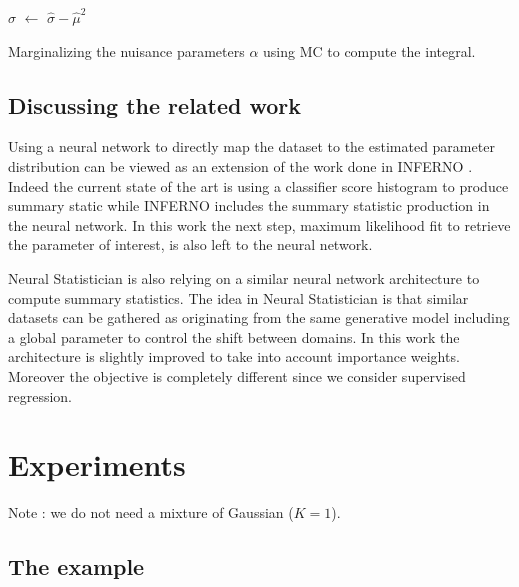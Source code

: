 \begin{algorithm}[H]
$\hat\sigma$  $\gets$ $\hat\sigma - \hat\mu^2$ \;
\caption{Marginalizing the nuisance parameters $\alpha$ using MC to compute the integral.}
\end{algorithm}


\subsection{Discussing the related work} 

Using a neural network to directly map the dataset to the estimated parameter distribution can be viewed as an extension of the work done in INFERNO \cite{DECASTRO2019170inferno}. 
Indeed the current state of the art is using a classifier score histogram to produce summary static while INFERNO includes the summary statistic production in the neural network.
In this work the next step, maximum likelihood fit to retrieve the parameter of interest, is also left to the neural network.

Neural Statistician \cite{Edwards17neuralstatistician} is also relying on a similar neural network architecture to compute summary statistics.
The idea in Neural Statistician is that similar datasets can be gathered as originating from the same generative model including a global parameter to control the shift between domains.
In this work the architecture is slightly improved to take into account importance weights.
Moreover the objective is completely different since we consider supervised regression.




\section{Experiments}

Note : we do not need a mixture of Gaussian ($K=1$).


\subsection{The example} 

